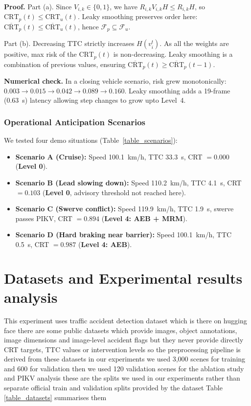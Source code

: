 \documentclass[preprint,12pt]{elsarticle}
\begin{document}
\textbf{Proof.} Part (a). Since $V_{i,k} \in \{0, 1\}$, we have $R_{i,k} V_{i,k} H \le R_{i,k} H$, so $\text{CRT}_p(t) \le \text{CRT}_u(t)$. Leaky smoothing preserves order here: $\overline{\text{CRT}}_p(t) \le \overline{\text{CRT}}_u(t)$, hence $\mathcal{F}_p \subseteq \mathcal{F}_u$.

Part (b). Decreasing TTC strictly increases $H(v_i^t)$. As all the weights are positive, max risk of the $\text{CRT}_p(t)$ is non-decreasing. Leaky smoothing is a combination of previous values, ensuring $\overline{\text{CRT}}_p(t) \ge \overline{\text{CRT}}_p(t-1)$. 

\textbf{Numerical check.} In a closing vehicle scenario, risk grew monotonically: $0.003 \rightarrow 0.015 \rightarrow 0.042 \rightarrow 0.089 \rightarrow 0.160$. Leaky smoothing adds a 19-frame (0.63~s) latency allowing step changes to grow upto Level~4.

\subsubsection{Operational Anticipation Scenarios}
We tested four demo situations (Table~\ref{table_scenarios}):
\begin{itemize}
    \item \textbf{Scenario A (Cruise):} Speed 100.1~km/h, TTC 33.3~s, CRT $= 0.000$ (\textbf{Level 0}).
    \item \textbf{Scenario B (Lead slowing down):} Speed 110.2~km/h, TTC 4.1~s, CRT $= 0.103$ (\textbf{Level 0}, advisory threshold not reached here).
    \item \textbf{Scenario C (Swerve conflict):} Speed 119.9~km/h, TTC 1.9~s, swerve passes PIKV, CRT $= 0.894$ (\textbf{Level 4: AEB + MRM}).
    \item \textbf{Scenario D (Hard braking near barrier):} Speed 100.1~km/h, TTC 0.5~s, CRT $= 0.987$ (\textbf{Level 4: AEB}).
\end{itemize}

\section{Datasets and Experimental results analysis} \label{section4}
This experiment uses traffic accident detection dataset which is there on hugging face \cite{hiennguyen2024accident} there are some public datasets which provide images, object annotations, image dimensions and image-level accident flags but they never provide directly CRT targets, TTC values or intervention levels so the preprocessing pipeline is derived from these datasets in our experiments we used 3,000 scenes for training and 600 for validation then we used 120 validation scenes for the ablation study and PIKV analysis these are the splits we used in our experiments rather than separate official train and validation splits provided by the dataset Table \ref{table_datasets} summarises them
\end{document}
